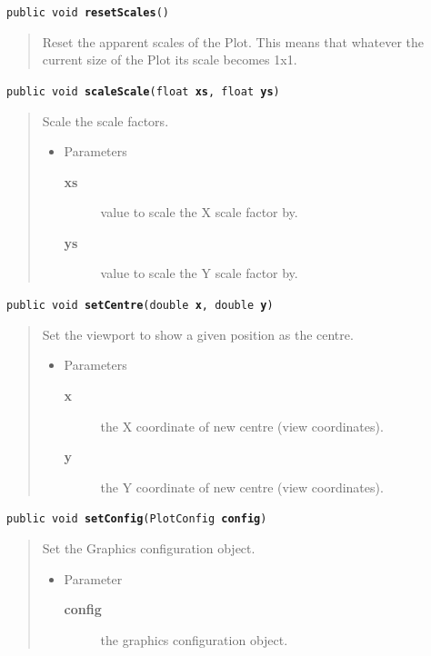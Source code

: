 \documentclass[twoside,11pt]{article}
\renewcommand{\_}{\texttt{\symbol{95}}}
\newcommand{\method}[1]{\texttt{#1}}
\newenvironment{desc}{\begin{quote}}{\end{quote}}
\begin{document}
\method{public void \textbf{resetScales}()\label{l196}\label{l197}}
\begin{desc}Reset the apparent scales of the Plot. This means that
 whatever the current size of the Plot its scale becomes 1x1.
\end{desc}

\method{public void \textbf{scaleScale}(\texttt{float} \textbf{xs}, \texttt{float} \textbf{ys})\label{l198}\label{l199}}
\begin{desc}Scale the scale factors.
\begin{itemize}
\item{Parameters
  \begin{description}
   \item[\textbf{xs}]{value to scale the X scale factor by.}
   \item[\textbf{ys}]{value to scale the Y scale factor by.}
  \end{description}}
\end{itemize}
\end{desc}

\method{public void \textbf{setCentre}(\texttt{double} \textbf{x}, \texttt{double} \textbf{y})\label{l200}\label{l201}}
\begin{desc}Set the viewport to show a given position as the centre.
\begin{itemize}
\item{Parameters
  \begin{description}
   \item[\textbf{x}]{the X coordinate of new centre (view coordinates).}
   \item[\textbf{y}]{the Y coordinate of new centre (view coordinates).}
  \end{description}}
\end{itemize}
\end{desc}

\method{public void \textbf{setConfig}(\texttt{PlotConfig} \textbf{config})\label{l202}\label{l203}}
\begin{desc}Set the Graphics configuration object.
\begin{itemize}
\item{Parameter
  \begin{description}
   \item[\textbf{config}]{the graphics configuration object.}
  \end{description}}
\end{itemize}
\end{desc}
\end{document}

